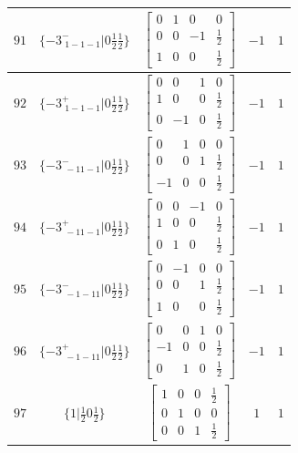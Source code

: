 \documentclass[fleqn,8pt]{jsarticle}
\begin{document}
\begin{longtable}{ccccc}
$ 91 $ & $ \{-3^{-}_{\,\,1-1-1}|0 \frac{1}{2} \frac{1}{2}\} $ & $ \begin{bmatrix} 0 & 1 & 0 & 0 \\ 0 & 0 & -1 & \frac{1}{2} \\ 1 & 0 & 0 & \frac{1}{2} \end{bmatrix} $ & $ -1 $ & $ 1 $ \\ \hline
$ 92 $ & $ \{-3^{+}_{\,\,1-1-1}|0 \frac{1}{2} \frac{1}{2}\} $ & $ \begin{bmatrix} 0 & 0 & 1 & 0 \\ 1 & 0 & 0 & \frac{1}{2} \\ 0 & -1 & 0 & \frac{1}{2} \end{bmatrix} $ & $ -1 $ & $ 1 $ \\ \hline
$ 93 $ & $ \{-3^{-}_{\,\,-11-1}|0 \frac{1}{2} \frac{1}{2}\} $ & $ \begin{bmatrix} 0 & 1 & 0 & 0 \\ 0 & 0 & 1 & \frac{1}{2} \\ -1 & 0 & 0 & \frac{1}{2} \end{bmatrix} $ & $ -1 $ & $ 1 $ \\ \hline
$ 94 $ & $ \{-3^{+}_{\,\,-11-1}|0 \frac{1}{2} \frac{1}{2}\} $ & $ \begin{bmatrix} 0 & 0 & -1 & 0 \\ 1 & 0 & 0 & \frac{1}{2} \\ 0 & 1 & 0 & \frac{1}{2} \end{bmatrix} $ & $ -1 $ & $ 1 $ \\ \hline
$ 95 $ & $ \{-3^{-}_{\,\,-1-11}|0 \frac{1}{2} \frac{1}{2}\} $ & $ \begin{bmatrix} 0 & -1 & 0 & 0 \\ 0 & 0 & 1 & \frac{1}{2} \\ 1 & 0 & 0 & \frac{1}{2} \end{bmatrix} $ & $ -1 $ & $ 1 $ \\ \hline
$ 96 $ & $ \{-3^{+}_{\,\,-1-11}|0 \frac{1}{2} \frac{1}{2}\} $ & $ \begin{bmatrix} 0 & 0 & 1 & 0 \\ -1 & 0 & 0 & \frac{1}{2} \\ 0 & 1 & 0 & \frac{1}{2} \end{bmatrix} $ & $ -1 $ & $ 1 $ \\ \hline
$ 97 $ & $ \{1|\frac{1}{2} 0 \frac{1}{2}\} $ & $ \begin{bmatrix} 1 & 0 & 0 & \frac{1}{2} \\ 0 & 1 & 0 & 0 \\ 0 & 0 & 1 & \frac{1}{2} \end{bmatrix} $ & $ 1 $ & $ 1 $ \\ \hline

\end{longtable}
\end{document}
